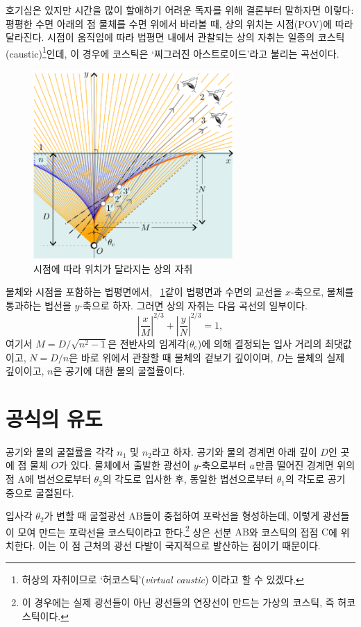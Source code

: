 \documentclass[twocolumn]{article}
\begin{document}
호기심은 있지만 시간을 많이 할애하기 어려운 독자를 위해 결론부터 말하자면 이렇다:  
평평한 수면 아래의 점 물체를 수면 위에서 바라볼 때, 상의 위치는 시점(POV)에 따라 달라진다. 
시점이 움직임에 따라 법평면 내에서 관찰되는 상의 자취는 일종의  코스틱(caustic)\footnote{허상의 
자취이므로 `허코스틱'(\emph{virtual caustic}) 이라고 할 수 있겠다.}인데, 이 경우에 
코스틱은 `찌그러진 아스트로이드'라고 불리는 곡선이다.
	
\begin{figure}
	\centering
	\includegraphics[width=3in]{figs/g409.eps}
	\caption{시점에 따라 위치가 달라지는 상의 자취}
	\label{fig:caustic}
\end{figure}

물체와 시점을 포함하는 법평면에서, \figurename\ \ref{fig:caustic}\과 같이 법평면과 수면의 교선을 $x$-축으로, 
물체를 통과하는 법선을 $y$-축으로 하자. 그러면 상의 자취는 다음 곡선의 일부이다.
	$$ \left| \dfrac{x}{M} \right| ^ {2/3} 
	+ \left| \dfrac{y}{N} \right| ^ {2/3} = 1,$$
여기서 $M = D/\sqrt{n^2 - 1}$은 전반사의 임계각($\theta_{\mathrm{c}}$)에 의해 결정되는 입사 거리의 최댓값이고, 
$N = D/n$은 바로 위에서 관찰할 때 물체의 겉보기 깊이이며, 
$D$는 물체의 실제 깊이이고, $n$은 공기에 대한 물의 굴절률이다.
	
\section{공식의 유도}
	
공기와 물의 굴절률을 각각 $n_1$ 및 $n_2$라고 하자. 공기와 물의 경계면 아래 깊이 $D$인 곳에 점 물체 $O$가 있다. 
물체에서 출발한 광선이 $y$-축으로부터 ${a}$만큼 떨어진 경계면 위의 점 A에 
법선으로부터 $\theta_2$의 각도로 입사한 후, 동일한 법선으로부터 $\theta_1$의 각도로 공기 중으로 굴절된다.

입사각 $\theta_2$가 변할 때 굴절광선 ${\mathrm{AB}}$들이 중첩하여 포락선을 형성하는데, 이렇게 광선들이 모여 만드는 포락선을 코스틱이라고 한다.\footnote{이 경우에는 실제 광선들이 아닌 광선들의 연장선이 만드는 가상의 코스틱, 즉 허코스틱이다.} 상은 선분 ${\mathrm{AB}}$와 코스틱의 접점 $\mathrm{C}$에 위치한다. 
이는 이 점 근처의 광선 다발이 국지적으로 발산하는 점이기 때문이다. 
\end{document}
